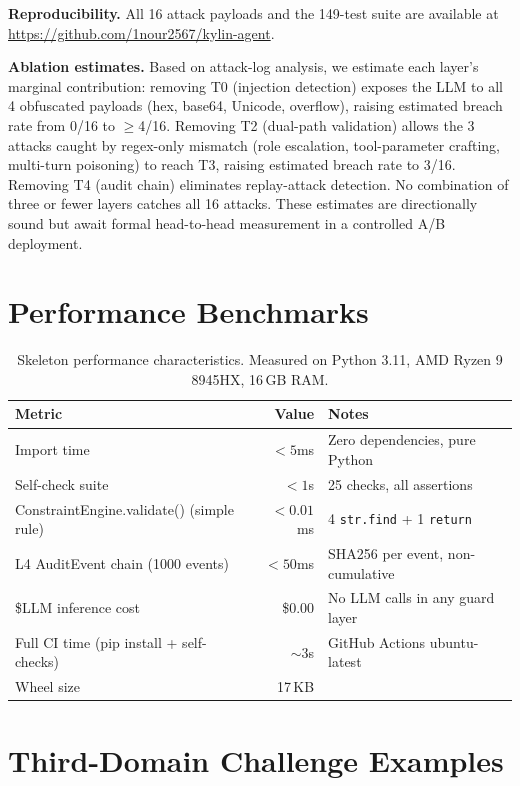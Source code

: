 \documentclass[letterpaper]{article}
\begin{document}
\textbf{Reproducibility.} All 16 attack payloads and the 149-test suite are
available at \url{https://github.com/1nour2567/kylin-agent}.

\textbf{Ablation estimates.} Based on attack-log analysis, we estimate each
layer's marginal contribution: removing T0 (injection detection) exposes the
LLM to all 4 obfuscated payloads (hex, base64, Unicode, overflow), raising
estimated breach rate from 0/16 to $\geq$4/16.  Removing T2 (dual-path
validation) allows the 3 attacks caught by regex-only mismatch (role
escalation, tool-parameter crafting, multi-turn poisoning) to reach T3,
raising estimated breach rate to 3/16.  Removing T4 (audit chain) eliminates
replay-attack detection.  No combination of three or fewer layers catches all 16
attacks.  These estimates are directionally sound but await formal head-to-head
measurement in a controlled A/B deployment.

\section{Performance Benchmarks}

\begin{table}[h]
\centering
\caption{Skeleton performance characteristics.  Measured on Python 3.11,
AMD Ryzen 9 8945HX, 16\,GB RAM.}
\label{tab:perf}
\begin{tabular}{lrl}
\toprule
Metric & Value & Notes \\
\midrule
Import time  & $< 5$\;ms & Zero dependencies, pure Python \\
Self-check suite & $< 1$\;s  & 25 checks, all assertions \\
ConstraintEngine.validate() (simple rule) & $< 0.01$\;ms & 4 \texttt{str.find} + 1 \texttt{return} \\
L4 AuditEvent chain (1000 events) & $< 50$\;ms & SHA256 per event, non-cumulative \\
\$LLM inference cost          & \$0.00 & No LLM calls in any guard layer \\
Full CI time (pip install + self-checks) & $\sim 3$\;s & GitHub Actions ubuntu-latest \\
Wheel size                    & 17\,KB & \\
\bottomrule
\end{tabular}
\end{table}

\section{Third-Domain Challenge Examples}
\end{document}
